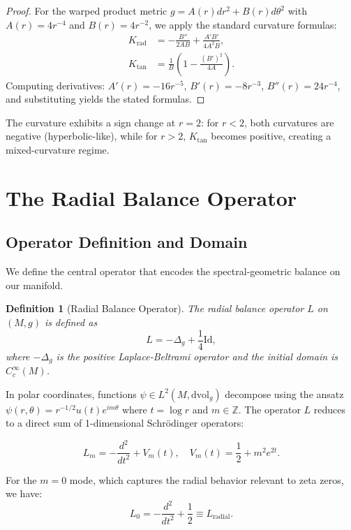 \documentclass[12pt]{article}
\newtheorem{definition}[theorem]{Definition}
\begin{document}
\begin{proof}
For the warped product metric $g = A(r)dr^2 + B(r)d\theta^2$ with $A(r) = 4r^{-4}$ and $B(r) = 4r^{-2}$, we apply the standard curvature formulas:
\begin{align}
K_{\text{rad}} &= -\frac{B''}{2AB} + \frac{A'B'}{4A^2B}, \\
K_{\text{tan}} &= \frac{1}{B}\left(1 - \frac{(B')^2}{4A}\right).
\end{align}
Computing derivatives: $A'(r) = -16r^{-5}$, $B'(r) = -8r^{-3}$, $B''(r) = 24r^{-4}$, and substituting yields the stated formulas.
\end{proof}

The curvature exhibits a sign change at $r = 2$: for $r < 2$, both curvatures are negative (hyperbolic-like), while for $r > 2$, $K_{\text{tan}}$ becomes positive, creating a mixed-curvature regime.

\section{The Radial Balance Operator}

\subsection{Operator Definition and Domain}

We define the central operator that encodes the spectral-geometric balance on our manifold.

\begin{definition}[Radial Balance Operator]
The \textit{radial balance operator} $L$ on $(M, g)$ is defined as
\begin{equation}
L = -\Delta_g + \frac{1}{4}\text{Id},
\end{equation}
where $-\Delta_g$ is the positive Laplace-Beltrami operator and the initial domain is $C_c^\infty(M)$.
\end{definition}

In polar coordinates, functions $\psi \in L^2(M, \text{dvol}_g)$ decompose using the ansatz $\psi(r, \theta) = r^{-1/2} u(t) e^{im\theta}$ where $t = \log r$ and $m \in \mathbb{Z}$. The operator $L$ reduces to a direct sum of 1-dimensional Schr\"odinger operators:

\begin{equation}
L_m = -\frac{d^2}{dt^2} + V_m(t), \quad V_m(t) = \frac{1}{2} + m^2 e^{2t}.
\end{equation}

For the $m = 0$ mode, which captures the radial behavior relevant to zeta zeros, we have:
\begin{equation}
L_0 = -\frac{d^2}{dt^2} + \frac{1}{2} \equiv L_{\text{radial}}.
\end{equation}
\end{document}
